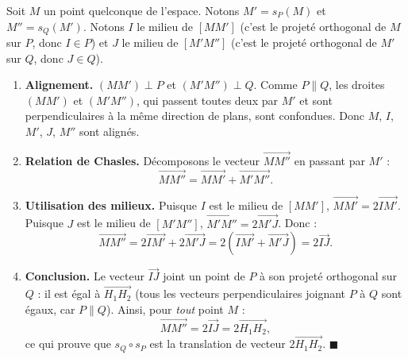 \documentclass[11pt]{article}
\begin{document}
\begin{experience}
Soit $M$ un point quelconque de l'espace. Notons $M' = s_P(M)$ et $M'' = s_Q(M')$. Notons $I$ le milieu de $[MM']$ (c'est le projeté orthogonal de $M$ sur $P$, donc $I \in P$) et $J$ le milieu de $[M'M'']$ (c'est le projeté orthogonal de $M'$ sur $Q$, donc $J \in Q$).
\begin{enumerate}
\item \textbf{Alignement.} $(MM') \perp P$ et $(M'M'') \perp Q$. Comme $P \parallel Q$, les droites $(MM')$ et $(M'M'')$, qui passent toutes deux par $M'$ et sont perpendiculaires à la même direction de plans, sont confondues. Donc $M$, $I$, $M'$, $J$, $M''$ sont alignés.
\item \textbf{Relation de Chasles.} Décomposons le vecteur $\overrightarrow{MM''}$ en passant par $M'$ :
\[ \overrightarrow{MM''} = \overrightarrow{MM'} + \overrightarrow{M'M''}. \]
\item \textbf{Utilisation des milieux.} Puisque $I$ est le milieu de $[MM']$, $\overrightarrow{MM'} = 2\overrightarrow{IM'}$. Puisque $J$ est le milieu de $[M'M'']$, $\overrightarrow{M'M''} = 2\overrightarrow{M'J}$. Donc :
\[ \overrightarrow{MM''} = 2\overrightarrow{IM'} + 2\overrightarrow{M'J} = 2\left(\overrightarrow{IM'} + \overrightarrow{M'J}\right) = 2\overrightarrow{IJ}. \]
\item \textbf{Conclusion.} Le vecteur $\overrightarrow{IJ}$ joint un point de $P$ à son projeté orthogonal sur $Q$ : il est égal à $\overrightarrow{H_1H_2}$ (tous les vecteurs perpendiculaires joignant $P$ à $Q$ sont égaux, car $P \parallel Q$). Ainsi, pour \emph{tout} point $M$ :
\[ \overrightarrow{MM''} = 2\overrightarrow{IJ} = 2\overrightarrow{H_1H_2}, \]
ce qui prouve que $s_Q \circ s_P$ est la translation de vecteur $2\overrightarrow{H_1H_2}$. \hfill$\blacksquare$
\end{enumerate}
\end{experience}
\end{document}
